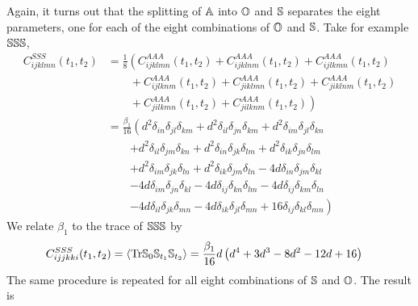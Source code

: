 \documentclass[thesis.tex]{subfiles}
\begin{document}
Again, it turns out that the splitting of $\mathbb{A}$ into $\mathbb{O}$ and $\mathbb{S}$ separates the eight parameters, one for each of the eight combinations of $\mathbb{O}$ and $\mathbb{S}$. Take for example $\mathbb{S}\mathbb{S}\mathbb{S}$,
\begin{align*}
C^{SSS}_{ijklmn}(t_1,t_2) &= \frac{1}{8}\left(
C^{AAA}_{ijklmn}(t_1,t_2) +
C^{AAA}_{ijklnm}(t_1,t_2) +
C^{AAA}_{ijlkmn}(t_1,t_2) \right.\\&\qquad+\left.
C^{AAA}_{ijlknm}(t_1,t_2) +
C^{AAA}_{jiklmn}(t_1,t_2) +
C^{AAA}_{jiklnm}(t_1,t_2) \right.\\&\qquad+\left.
C^{AAA}_{jilkmn}(t_1,t_2) +
C^{AAA}_{jilknm}(t_1,t_2) \right)
\\
&= \frac{\beta_{1}}{16} \left(
d^2 \delta_{in} \delta_{jl} \delta_{km}+ 
d^2 \delta_{il} \delta_{jn} \delta_{km}+
d^2 \delta_{im} \delta_{jl} \delta_{kn}\right.\\ &\qquad\left.+
d^2 \delta_{il} \delta_{jm} \delta_{kn}+
d^2 \delta_{in} \delta_{jk} \delta_{lm}+
d^2 \delta_{ik} \delta_{jn} \delta_{lm}\right.\\ &\qquad\left.+
d^2 \delta_{im} \delta_{jk} \delta_{ln}+
d^2 \delta_{ik} \delta_{jm} \delta_{ln}-
4 d \delta_{in} \delta_{jm} \delta_{kl}\right.\\ &\qquad\left.-
4 d \delta_{im} \delta_{jn} \delta_{kl}-
4 d \delta_{ij} \delta_{kn} \delta_{lm}-
4 d \delta_{ij} \delta_{km} \delta_{ln}\right.\\ &\qquad\left.-
4 d \delta_{il} \delta_{jk} \delta_{mn}-
4 d \delta_{ik} \delta_{jl} \delta_{mn}+
16 \delta_{ij} \delta_{kl} \delta_{mn} \right)
\end{align*}
We relate $\beta_1$ to the trace of $\mathbb{S} \mathbb{S} \mathbb{S}$ by
\begin{align*}
	C^{SSS}_{ijjkki}(t_1, t_2)&=\left\langle\mbox{Tr} \mathbb{S}_0\mathbb{S}_{t_1}\mathbb{S}_{t_2}\right\rangle = 
	\frac{\beta_1}{16}  d \left(d^4+3 d^3-8 d^2-12 d+16\right)
\end{align*}
The same procedure is repeated for all eight combinations of $\mathbb{S}$ and $\mathbb{O}$. The result is
\end{document}
